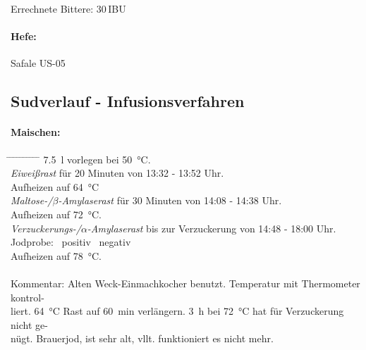 \documentclass[12pt,oneside,a4paper]{scrartcl}
\begin{document}
\vspace{.25cm}
\hspace{1cm}Errechnete Bittere: 30\,IBU
%
\paragraph{Hefe:}
	Safale US-05

%
\subsection*{Sudverlauf - Infusionsverfahren}	

\paragraph{Maischen:}
	\begin{tabbing}\hspace{1cm} \=
		\hspace{1cm} \= \hspace{1cm} \=\hspace{1cm} \=\hspace{1cm} \=\hspace{1cm} \= \hspace{1cm} \= \hspace{1cm} \= \hspace{1cm} \= \hspace{1cm} \= \kill
		\> \SI{7,5}{\litre} vorlegen bei \SI{50}{\celsius}.\\
		\> \textit{Eiweißrast} für 20 Minuten von 13:32 - 13:52 Uhr.\\
		\> \> Aufheizen auf \SI{64}{\celsius}\\
		\> \textit{Maltose-/$\beta$-Amylaserast} für 30 Minuten von 14:08 - 14:38 Uhr.\\
		\> \> Aufheizen auf \SI{72}{\celsius}.\\
		\> \textit{Verzuckerungs-/$\alpha$-Amylaserast} bis zur Verzuckerung von 14:48 - 18:00 Uhr.\\
		\> \> \> Jodprobe: \> \> \CheckedBox \ positiv \> \> \Square \ negativ\\
		\> \> Aufheizen auf \SI{78}{\celsius}.\\\\
		\> Kommentar: \>\>\> Alten Weck-Einmachkocher benutzt. Temperatur mit Thermometer kontrol-\\
		\>\>\>liert. \SI{64}{\celsius} Rast auf \SI{60}{\minute} verlängern. \SI{3}{\hour} bei \SI{72}{\celsius} hat für Verzuckerung nicht ge-\\
		\>\>\>nügt. Brauerjod, ist sehr alt, vllt. funktioniert es nicht mehr.\\
	\end{tabbing}
\end{document}
